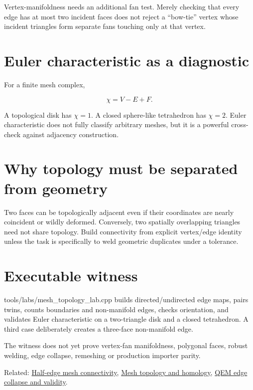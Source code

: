 Vertex-manifoldness needs an additional fan test. Merely checking that every edge has at most two incident faces does not reject a ``bow-tie'' vertex whose incident triangles form separate fans touching only at that vertex.

\section{Euler characteristic as a diagnostic}\label{appendix-faac749c9cdd-euler-characteristic-as-a-diagnostic}

For a finite mesh complex,

\[
\chi = V-E+F.
\]

A topological disk has \(\chi=1\). A closed sphere-like tetrahedron has \(\chi=2\). Euler characteristic does not fully classify arbitrary meshes, but it is a powerful cross-check against adjacency construction.

\section{Why topology must be separated from geometry}\label{appendix-faac749c9cdd-why-topology-must-be-separated-from-geometry}

Two faces can be topologically adjacent even if their coordinates are nearly coincident or wildly deformed. Conversely, two spatially overlapping triangles need not share topology. Build connectivity from explicit vertex/edge identity unless the task is specifically to weld geometric duplicates under a tolerance.

\section{Executable witness}\label{appendix-faac749c9cdd-executable-witness}

tools/labs/mesh\_topology\_lab.cpp builds directed/undirected edge maps, pairs twins, counts boundaries and non-manifold edges, checks orientation, and validates Euler characteristic on a two-triangle disk and a closed tetrahedron. A third case deliberately creates a three-face non-manifold edge.

The witness does not yet prove vertex-fan manifoldness, polygonal faces, robust welding, edge collapse, remeshing or production importer parity.

Related: \hyperref[appendix-1aea26b2307f]{Half-edge mesh connectivity}, \hyperref[appendix-e38976cbbf86]{Mesh topology and homology}, \hyperref[appendix-89db9fe1bc8a]{QEM edge collapse and validity}.
